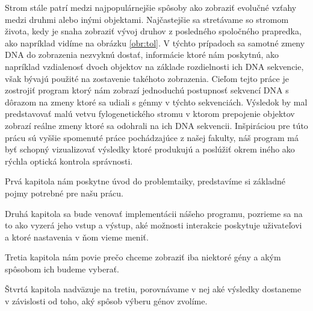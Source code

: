 Strom stále patrí medzi najpopulárnejšie spôsoby ako zobraziť evolučné vzťahy medzi druhmi alebo inými objektami.
Najčastejšie sa stretávame so stromom života, kedy je snaha zobraziť vývoj druhov z posledného spoločného prapredka, ako napríklad vidíme na obrázku \ref{obr:tol}.
V týchto prípadoch sa samotné zmeny DNA do zobrazenia nezvyknú dostať, informácie ktoré nám poskytnú, 
ako napríklad vzdialenosť dvoch objektov na základe rozdielnosti ich DNA sekvencie, však bývajú použité na zostavenie takéhoto zobrazenia.
Cieľom tejto práce je zostrojiť program ktorý nám zobrazí jednoduchú postupnosť sekvencí DNA s dôrazom na zmeny ktoré sa udiali s génmy v týchto sekvenciách.
Výsledok by mal predstavovať malú vetvu fylogenetického stromu v ktorom prepojenie objektov zobrazí reálne zmeny ktoré sa odohrali na ich DNA sekvencii.
Inšpiráciou pre túto prácu sú vyššie spomenuté práce pochádzajúce z našej fakulty,
náš program má byť schopný vizualizovať výsledky ktoré produkujú a poslúžiť okrem iného ako rýchla optická kontrola správnosti.

Prvá kapitola nám poskytne úvod do problemtaiky, predstavíme si základné pojmy potrebné pre našu prácu.

Druhá kapitola sa bude venovať implementácii nášeho programu, pozrieme sa na to ako vyzerá jeho vstup a výstup,
aké možnosti interakcie poskytuje uživateľovi a ktoré nastavenia v ňom vieme meniť.

Tretia kapitola nám povie prečo chceme zobraziť iba niektoré gény a akým spôsobom ich budeme vyberať.

Štvrtá kapitola nadväzuje na tretiu, porovnávame v nej aké výsledky dostaneme v závislosti od toho, aký spôsob výberu génov zvolíme.
